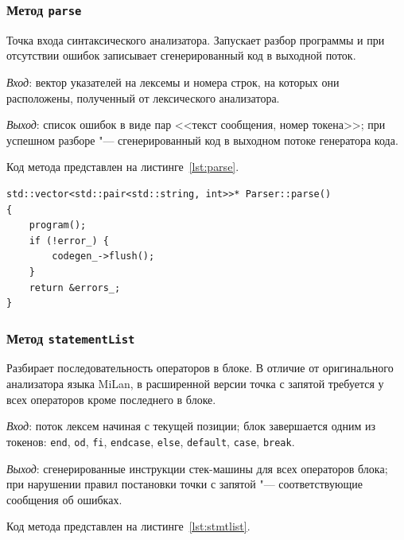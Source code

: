\documentclass[a4paper,final]{article}
\begin{document}
\subsubsection*{Метод \texttt{parse}}\mbox{}

Точка входа синтаксического анализатора. Запускает разбор программы и
при отсутствии ошибок записывает сгенерированный код в выходной поток.

\textit{Вход}: вектор указателей на лексемы и номера строк, на которых они расположены, полученный от лексического анализатора.

\textit{Выход}: список ошибок в виде пар <<текст сообщения, номер токена>>;
при успешном разборе "--- сгенерированный код в выходном потоке генератора кода.

Код метода представлен на листинге~\ref{lst:parse}.

\begin{lstlisting}[caption={Метод Parser::parse}, label=lst:parse]
std::vector<std::pair<std::string, int>>* Parser::parse()
{
    program();
    if (!error_) {
        codegen_->flush();
    }
    return &errors_;
}
\end{lstlisting}

\subsubsection*{Метод \texttt{statementList}}

Разбирает последовательность операторов в блоке. В отличие от оригинального
анализатора языка MiLan, в расширенной версии точка с запятой требуется у всех операторов кроме последнего в блоке.

\textit{Вход}: поток лексем начиная с текущей позиции; блок завершается
одним из токенов: \texttt{end}, \texttt{od}, \texttt{fi},
\texttt{endcase}, \texttt{else}, \texttt{default}, \texttt{case}, \texttt{break}.

\textit{Выход}: сгенерированные инструкции стек-машины для всех операторов блока;
при нарушении правил постановки точки с запятой "--- соответствующие сообщения
об ошибках.

Код метода представлен на листинге~\ref{lst:stmtlist}.
\end{document}
